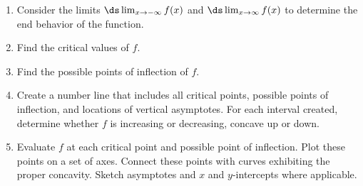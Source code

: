 \renewcommand{\thmcontinues}[1]{Curve Sketching --- Continued}
{\hspace{0pt}\begin{enumerate}[resume=curvesketching] %
\fi
\item		Consider the limits $\ds\lim_{x\to-\infty}f(x)$ and $\ds\lim_{x\to\infty}f(x)$ to determine the end behavior of the function.
\item		Find the critical values of $f$.
\item		Find the possible points of inflection of $f$.
\item		Create a number line that includes all critical points, possible points of inflection, and locations of vertical asymptotes. For each interval created, determine whether $f$ is increasing or decreasing, concave up or down.
\item		Evaluate $f$ at each critical point and possible point of inflection. Plot these points on a set of axes. Connect these points with curves exhibiting the proper concavity. Sketch asymptotes and $x$ and $y$-intercepts where applicable.
\end{enumerate}
}


